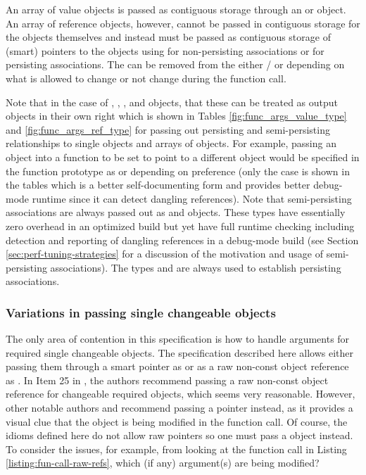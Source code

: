 \documentclass[pdf,ps2pdf,11pt]{SANDreport}
\begin{document}
An array of value objects is passed as contiguous storage through an
{} or {} object.  An
array of reference objects, however, cannot be passed in contiguous
storage for the objects themselves and instead must be passed as
contiguous storage of (smart) pointers to the objects using
{} for non-persisting
associations or {} for
persisting associations.  The {} can be removed from the
either {}/{} or {} depending on what
is allowed to change or not change during the function call.

Note that in the case of {}, {}, {},
and {} objects, that these can be treated as output
objects in their own right which is shown in Tables
{}\ref{fig:func_args_value_type} and {}\ref{fig:func_args_ref_type}
for passing out persisting and semi-persisting relationships to single
objects and arrays of objects.  For example, passing an {}
object into a function to be set to point to a different {}
object would be specified in the function prototype as {} or {} depending on preference (only the
case {} is shown in the tables which is a
better self-documenting form and provides better debug-mode runtime
since it can detect dangling references).  Note that semi-persisting
associations are always passed out as {} and
{} objects.  These types have essentially zero overhead
in an optimized build but yet have full runtime checking including
detection and reporting of dangling references in a debug-mode build
(see Section {}\ref{sec:perf-tuning-strategies} for a discussion of
the motivation and usage of semi-persisting associations).  The types
{} and {} are always used to establish
persisting associations.


%
{}\subsubsection*{Variations in passing single changeable objects}
\label{sec:vars-passing-single-objs}
%

The only area of contention in this specification is how to handle
arguments for required single changeable objects.  The specification
described here allows either passing them through a smart pointer as
{} or as a raw non-const object reference as
{}.  In Item 25 in {}\cite{C++CodingStandards05}, the authors
recommend passing a raw non-const object reference {} for
changeable required objects, which seems very reasonable.  However,
other notable authors {}\cite[Section Section 5.5]{stroustrup97} and
{}\cite[Section 13.2]{CodeComplete2nd04} recommend passing a pointer
instead, as it provides a visual clue that the object is being
modified in the function call.  Of course, the idioms defined here do
not allow raw pointers so one must pass a {}
object instead.  To consider the issues, for example, from looking at
the function call in Listing {}\ref{listing:fun-call-raw-refs}, which
(if any) argument(s) are being modified?
\end{document}
